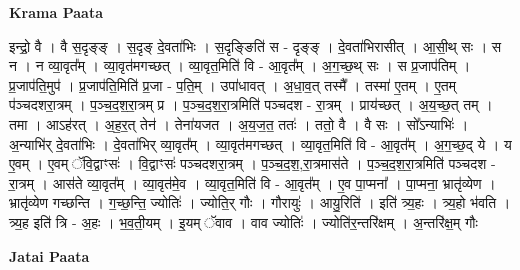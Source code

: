 \documentclass[17pt]{extarticle}
\begin{document}
\textbf{Krama Paata} \newline

इन्द्रो॒ वै । वै स॒दृङ्‍ङ् । स॒दृङ् दे॒वता॑भिः । स॒दृङ्‍ङिति॑ स - दृङ्‍ङ् । दे॒वता॑भिरासीत् । आ॒सी॒थ् सः । स न । न व्या॒वृत᳚म् । व्या॒वृत॑मगच्छत् । व्या॒वृत॒मिति॑ वि - आ॒वृत᳚म् । अ॒ग॒च्छ॒थ् सः । स प्र॒जाप॑तिम् । प्र॒जाप॑ति॒मुप॑ । प्र॒जाप॑ति॒मिति॑ प्र॒जा - प॒ति॒म् । उपा॑धावत् । अ॒धा॒व॒त् तस्मै᳚ । तस्मा॑ ए॒तम् । ए॒तम् प॑ञ्चदशरा॒त्रम् । प॒ञ्च॒द॒श॒रा॒त्रम् प्र । प॒ञ्च॒द॒श॒रा॒त्रमिति॑ पञ्चदश - रा॒त्रम् । प्राय॑च्छत् । अ॒य॒च्छ॒त् तम् । तमा । आऽह॑रत् । अ॒ह॒र॒त् तेन॑ । तेना॑यजत । अ॒य॒ज॒त॒ ततः॑ । ततो॒ वै । वै सः । सो᳚ऽन्याभिः॑ । अ॒न्याभि॑र् दे॒वता॑भिः । दे॒वता॑भिर् व्या॒वृत᳚म् । व्या॒वृत॑मगच्छत् । व्या॒वृत॒मिति॑ वि - आ॒वृत᳚म् । अ॒ग॒च्छ॒द् ये । य ए॒वम् । ए॒वम् ॅवि॒द्वाꣳसः॑ । वि॒द्वाꣳसः॑ पञ्चदशरा॒त्रम् । प॒ञ्च॒द॒श॒,रा॒त्रमास॑ते । प॒ञ्च॒द॒श॒रा॒त्रमिति॑ पञ्चदश - रा॒त्रम् । आस॑ते व्या॒वृत᳚म् । व्या॒वृत॑मे॒व । व्या॒वृत॒मिति॑ वि - आ॒वृत᳚म् । ए॒व पा॒प्मना᳚ । पा॒प्मना॒ भ्रातृ॑व्येण । भ्रातृ॑व्येण गच्छन्ति । ग॒च्छ॒न्ति॒ ज्योतिः॑ । ज्योति॒र् गौः । गौरायुः॑ । आयु॒रिति॑ । इति॑ त्र्य॒हः । त्र्य॒हो भ॑वति । त्र्य॒ह इति॑ त्रि - अ॒हः । भ॒व॒ती॒यम् । इ॒यम् ॅवाव । वाव ज्योतिः॑ । ज्योति॑र॒न्तरि॑क्षम् । अ॒न्तरि॑क्ष॒म् गौः \newline

\textbf{Jatai Paata} \newline
\end{document}
